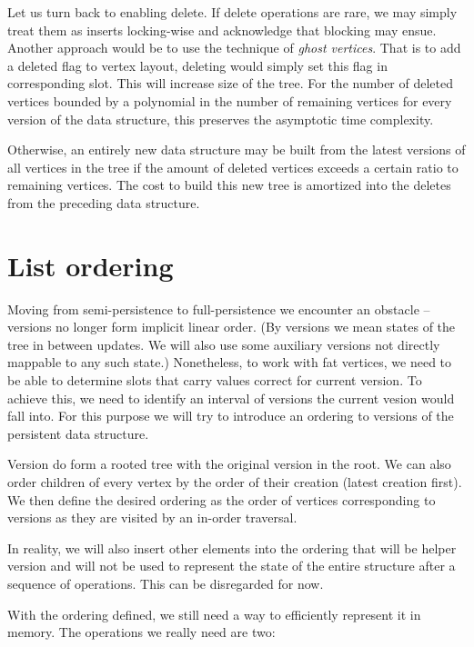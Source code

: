 Let us turn back to enabling delete. If delete operations are rare, we may simply treat them as inserts locking-wise and acknowledge that blocking may ensue. Another approach would be to use the technique of \textit{ghost vertices}. That is to add a deleted flag to vertex layout, deleting would simply set this flag in corresponding slot. This will increase size of the tree. For the number of deleted vertices bounded by a polynomial in the number of remaining vertices for every version of the data structure, this preserves the asymptotic time complexity. 

Otherwise, an entirely new data structure may be built from the latest versions of all vertices in the tree if the amount of deleted vertices exceeds a certain ratio to remaining vertices. The cost to build this new tree is amortized into the deletes from the preceding data structure.



\section{List ordering}

Moving from semi-persistence to full-persistence we encounter an obstacle -- versions no longer form implicit linear order. (By versions we mean states of the tree in between updates. We will also use some auxiliary versions not directly mappable to any such state.) Nonetheless, to work with fat vertices, we need to be able to determine slots that carry values correct for current version. To achieve this, we need to identify an interval of versions the current vesion would fall into. For this purpose we will try to introduce an ordering to versions of the persistent data structure.

Version do form a rooted tree with the original version in the root. We can also order children of every vertex by the order of their creation (latest creation first). We then define the desired ordering as the order of vertices corresponding to versions as they are visited by an in-order traversal. %

In reality, we will also insert other elements into the ordering that will be helper version and will not be used to represent the state of the entire structure after a sequence of operations. This can be disregarded for now.

With the ordering defined, we still need a way to efficiently represent it in memory. The operations we really need are two:


